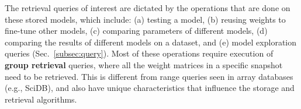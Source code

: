\documentclass[conference]{IEEEtran}
\begin{document}
The retrieval queries of interest are dictated by the operations that are done on these stored models, which include: 
(a) testing a model, (b) reusing weights to fine-tune other models, (c) comparing parameters of different models, (d) comparing the results of different models on a dataset, and (e) model exploration queries (Sec.~\ref{subsec:query}). Most of these operations require execution of {\bf group retrieval} queries, where all the weight matrices in a specific snapshot need to be retrieved. 
This is different from range queries seen in array databases (e.g., SciDB), and also have unique characteristics that 
influence the storage and retrieval algorithms. 
\end{document}
